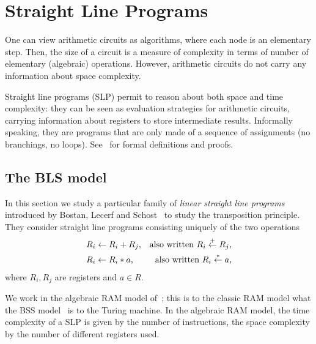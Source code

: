 \section{Straight Line Programs}
\label{sec:stra-line-progr}

One can view arithmetic circuits as algorithms, where each node is an
elementary step. Then, the size of a circuit is a measure of
complexity in terms of number of elementary (algebraic)
operations. However, arithmetic circuits do not carry any information
about space complexity.

Straight line programs
(SLP) permit to reason about
both space and time complexity: they can be seen as evaluation
strategies for arithmetic circuits, carrying information about
registers to store intermediate results. Informally speaking, they are
programs that are only made of a sequence of assignments (no
branchings, no loops).  See~\cite{burgisser+clausen-shokrollahi} for
formal definitions and proofs.

\subsection{The BLS model}
\label{sec:bls-model}
In this section we study a particular family of \emph{linear straight
  line programs} introduced by Bostan, Lecerf and
Schost~\cite{bostan+lecerf+schost:tellegen} to study the transposition
principle. They consider straight line programs consisting uniquely of
the two operations
\begin{align}
  \label{eq:269}
  R_i &\leftarrow R_i + R_j
  \text{,}
  &\text{also written }
  R_i \overset{+}{\leftarrow} R_j
  \text{,}\\
  \label{eq:272}
  R_i &\leftarrow R_i * a
  \text{,}
  &\text{also written }
  R_i \overset{*}{\leftarrow} a
  \text{,}
\end{align}
where $R_i,R_j$ are registers and $a\in R$. 

We work in the algebraic RAM model of~\cite{kaltofen88:gcd}; this is
to the classic RAM model what the BSS model~\cite{BSS} is to the
Turing machine. In the algebraic RAM model, the time complexity of a
SLP is given by the number of instructions, the space complexity by
the number of different registers used.

